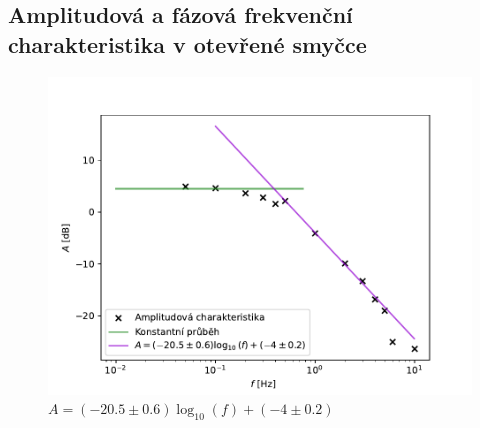 	\subsection{Amplitudová a fázová frekvenční charakteristika v otevřené smyčce}

		\begin{figure}[!hbt] %
			\centering
			\includegraphics[]{img/graf_amplitudova_otevrena.pdf} %
			\caption{$ A=(-20.5\pm 0.6)\log_10(f)+(-4\pm 0.2)$} %
			\label{fig:amplitudova_otevrena} %
		\end{figure}


